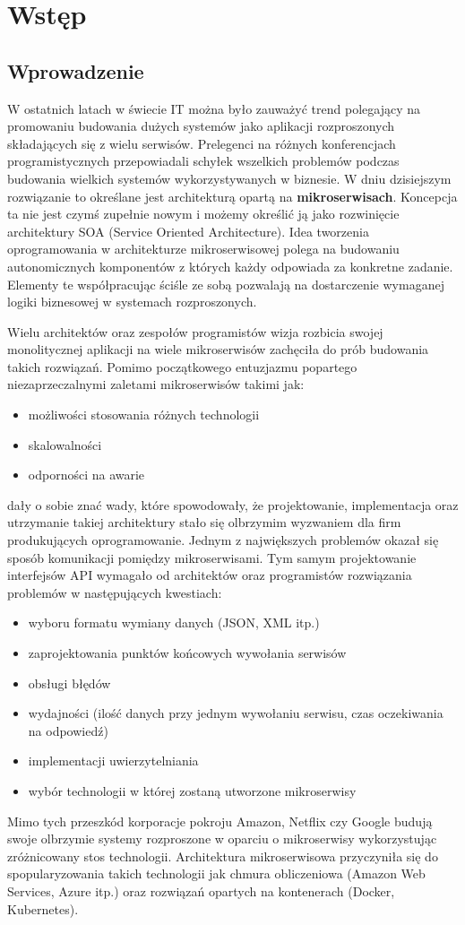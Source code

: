 \chapter{Wstęp}
\section{Wprowadzenie}
W ostatnich latach w świecie IT można było zauważyć trend polegający na promowaniu budowania dużych systemów jako aplikacji rozproszonych składających się z wielu serwisów. Prelegenci na różnych konferencjach programistycznych przepowiadali schyłek wszelkich problemów podczas budowania wielkich systemów wykorzystywanych w biznesie. W dniu dzisiejszym rozwiązanie to określane jest architekturą opartą na \textbf{mikroserwisach}. Koncepcja ta nie jest czymś zupełnie nowym i możemy określić ją jako rozwinięcie architektury SOA (Service Oriented Architecture). Idea tworzenia oprogramowania w architekturze mikroserwisowej polega na budowaniu autonomicznych komponentów z których każdy odpowiada za konkretne zadanie. Elementy te współpracując ściśle ze sobą pozwalają na dostarczenie wymaganej logiki biznesowej w systemach rozproszonych. \par Wielu architektów oraz zespołów programistów wizja rozbicia swojej monolitycznej aplikacji na wiele mikroserwisów zachęciła do prób budowania takich rozwiązań. Pomimo początkowego entuzjazmu popartego niezaprzeczalnymi zaletami mikroserwisów takimi jak:
\begin{itemize}
	\item możliwości stosowania różnych technologii
	\item skalowalności
	\item odporności na awarie
\end{itemize}
dały o sobie znać wady, które spowodowały, że projektowanie, implementacja oraz utrzymanie takiej architektury stało się olbrzymim wyzwaniem dla firm produkujących oprogramowanie. Jednym z największych problemów okazał się sposób komunikacji pomiędzy mikroserwisami. Tym samym projektowanie interfejsów API\cite{jacobson2015interfejs} wymagało od architektów oraz programistów rozwiązania problemów w następujących kwestiach:
\begin{itemize}
	\item wyboru formatu wymiany danych (JSON, XML itp.)
	\item zaprojektowania punktów końcowych wywołania serwisów
	\item obsługi błędów
	\item wydajności (ilość danych przy jednym wywołaniu serwisu, czas oczekiwania na odpowiedź)
	\item implementacji uwierzytelniania
	\item wybór technologii w której zostaną utworzone mikroserwisy
\end{itemize}
Mimo tych przeszkód korporacje pokroju Amazon, Netflix czy Google budują swoje olbrzymie systemy rozproszone w oparciu o mikroserwisy wykorzystując zróżnicowany stos technologii. Architektura mikroserwisowa przyczyniła się do spopularyzowania takich technologii jak chmura obliczeniowa (Amazon Web Services, Azure itp.) oraz rozwiązań opartych na kontenerach (Docker, Kubernetes).

